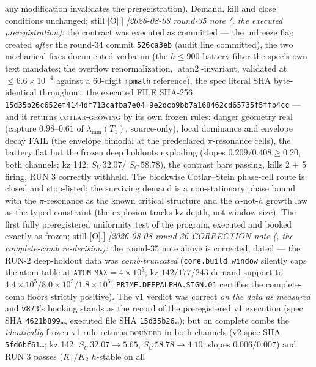 {any modification invalidates the preregistration).  Demand, kill
and close conditions unchanged; still [O].]
\emph{[2026-08-08 round-35 note
(, the executed
preregistration):} the contract was executed as committed --- the
unfreeze flag created \emph{after} the round-34 commit
\texttt{526ca3eb} (audit line committed), the two mechanical
fixes documented verbatim (the $h \le 900$ battery filter the
spec's own text mandates; the overflow renormalization,
$\operatorname{atan2}$-invariant, validated at $\le
6.6\times10^{-4}$ against a $60$-digit \texttt{mpmath}
reference), the spec literal SHA byte-identical throughout, the
executed FILE SHA-256
\texttt{15d35b26c652ef41\allowbreak 44df713cafba7e04\allowbreak
9e2dcb9bb7a16846\allowbreak 2cd65735f5ffb4cc} --- and it returns
\textsc{cotlar-growing} by its own frozen rules: danger geometry
real (capture $0.98$--$0.61$ of $\lambda_{\min}(T_1)$,
source-only), local dominance and envelope decay FAIL (the
envelope bimodal at the predeclared $\pi$-resonance cells), the
battery flat but the frozen deep holdouts exploding (slopes
$0.209/0.408 \ge 0.20$, both channels; kz 142: $S_U\,32.07$/
$S_C\,58.78$), the contrast bars passing, kills 2 $+$ 5 firing,
RUN 3 correctly withheld.  The blockwise Cotlar--Stein
phase-cell route is closed and stop-listed; the surviving demand
is a non-stationary phase bound with the $\pi$-resonance as the
known critical structure and the $\alpha$-not-$h$ growth law as
the typed constraint (the explosion tracks kz-depth, not window
size).  The first fully preregistered uniformity test of the
program, executed and booked exactly as frozen; still [O].]
\emph{[2026-08-08 round-36 CORRECTION note
(, the complete-comb
re-decision):} the round-35 note above is corrected, dated ---
the RUN-2 deep-holdout data was \emph{comb-truncated}
(\texttt{core.build\_window} silently caps the atom table at
$\texttt{ATOM\_MAX} = 4\times10^{5}$; kz $142/177/243$ demand
support to $4.4\times10^{5}/8.0\times10^{5}/1.8\times10^{6}$;
\texttt{PRIME.DEEPALPHA.SIGN.01} certifies the complete-comb
floors strictly positive).  The v1 verdict was correct \emph{on
the data as measured} and \texttt{v873}'s booking stands as the
record of the preregistered v1 execution (spec SHA
\texttt{4621b899\ldots}, executed file SHA
\texttt{15d35b26\ldots}); but on complete combs the
\emph{identically} frozen v1 rule returns \textsc{bounded} in
both channels (v2 spec SHA \texttt{5fd6bf61\ldots}; kz 142:
$S_U\,32.07 \to 5.65$, $S_C\,58.78 \to 4.10$; slopes
$0.006/0.007$) and RUN 3 passes ($K_1/K_2$ $h$-stable on all
}

